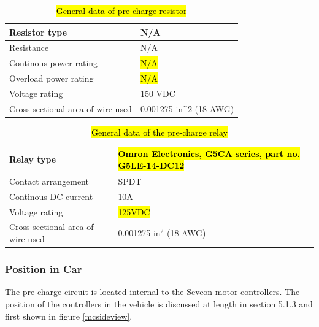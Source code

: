 \documentclass{article}
\DeclareRobustCommand{\hlr}[1]{{\sethlcolor{red}\hl{#1}}}
\begin{document}
            \begin{table}[H]
                \centering
                \begin{tabular}{|l|l|}
                \hline
                Resistor type & N/A \\ \hline
                Resistance & N/A \\ \hline
                Continous power rating & \hlr{N/A} \\ \hline
                Overload power rating & \hlr{N/A} \\ \hline
                Voltage rating & 150 VDC \\ \hline
                Cross-sectional area of wire used & 0.001275 in\textasciicircum 2 (18 AWG) \\ \hline
                \end{tabular}
                \caption{\hlr{General data of pre-charge resistor }}
                \label{prechargeresistor}
            \end{table}


            \begin{table}[H]
                \centering
                \begin{tabular}{|l|l|}
                \hline
                Relay type & \hlr{Omron Electronics, G5CA series, part no. G5LE-14-DC12} \\ \hline
                Contact arrangement & SPDT \\ \hline
                Continous DC current & 10A \\ \hline
                Voltage rating & \hlr{125VDC} \\ \hline
                Cross-sectional area of wire used & 0.001275 in$^{2}$ (18 AWG) \\ \hline
                \end{tabular}
                \caption{\hlr{General data of the pre-charge relay}}
                \label{PCrelay}
            \end{table}

        \subsubsection{Position in Car}

            The pre-charge circuit is located internal to the Sevcon motor controllers. The position of the controllers in the vehicle is discussed at length in section 5.1.3 and first shown in figure \ref{mcsideview}.
\end{document}
